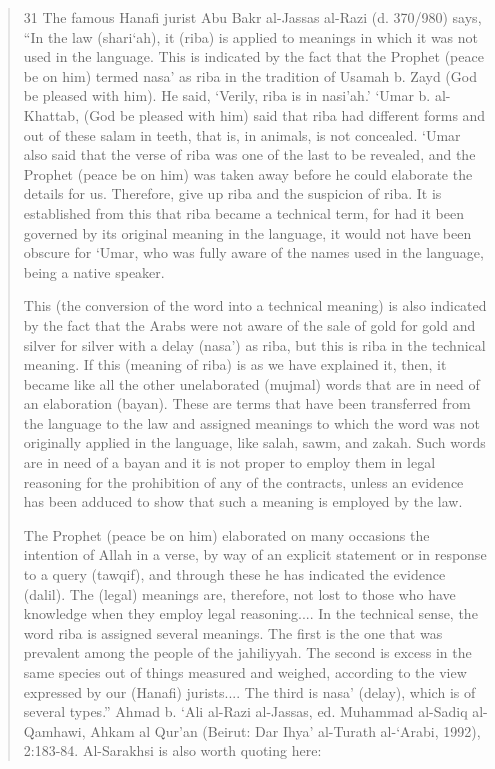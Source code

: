 \begin{quote}
31 The famous Hanafi jurist Abu Bakr al-Jassas al-Razi (d. 370/980) says, “In the law (shari‘ah), it (riba) is applied to meanings in which it was not used in the language. This is indicated by the fact that the Prophet (peace be on him) termed nasa' as riba in the tradition of Usamah b. Zayd (God be pleased with him). He said, ‘Verily, riba is in nasi'ah.' ‘Umar b. al-Khattab, (God be pleased with him) said that riba had different forms and out of these salam in teeth, that is, in animals, is not concealed. ‘Umar also said that the verse of riba was one of the last to be revealed, and the Prophet (peace be on him) was taken away before he could elaborate the details for us. Therefore, give up riba and the suspicion of riba. It is established from this that riba became a technical term, for had it been governed by its original meaning in the language, it would not have been obscure for ‘Umar, who was fully aware of the names used in the language, being a native speaker.

This (the conversion of the word into a technical meaning) is also indicated by the fact that the Arabs were not aware of the sale of gold for gold and silver for silver with a delay (nasa') as riba, but this is riba in the technical meaning. If this (meaning of riba) is as we have explained it, then, it became like all the other unelaborated (mujmal) words that are in need of an elaboration (bayan). These are terms that have been transferred from the language to the law and assigned meanings to which the word was not originally applied in the language, like salah, sawm, and zakah. Such words are in need of a bayan and it is not proper to employ them in legal reasoning for the prohibition of any of the contracts, unless an evidence has been adduced to show that such a meaning is employed by the law.

The Prophet (peace be on him) elaborated on many occasions the intention of Allah in a verse, by way of an explicit statement or in response to a query (tawqif), and through these he has indicated the evidence (dalil). The (legal) meanings are, therefore, not lost to those who have knowledge when they employ legal reasoning.... In the technical sense, the word riba is assigned several meanings. The first is the one that was prevalent among the people of the jahiliyyah. The second is excess in the same species out of things measured and weighed, according to the view expressed by our (Hanafi) jurists.... The third is nasa' (delay), which is of several types.” Ahmad b. ‘Ali al-Razi al-Jassas, ed. Muhammad al-Sadiq al-Qamhawi, Ahkam al Qur'an (Beirut: Dar Ihya' al-Turath al-‘Arabi, 1992), 2:183-84. Al-Sarakhsi is also worth quoting here:


\end{quote}
